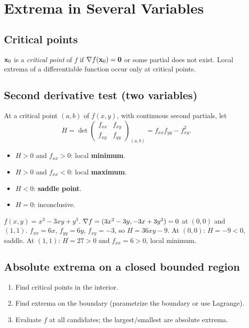 \section{Extrema in Several Variables}

\subsection{Critical points}
$\mathbf{x}_0$ is a \emph{critical point} of $f$ if $\nabla f(\mathbf{x}_0) = \mathbf{0}$ or some partial does
not exist. Local extrema of a differentiable function occur only at critical points.

\subsection{Second derivative test (two variables)}
At a critical point $(a,b)$ of $f(x,y)$, with continuous second partials, let
\[ H = \det \begin{pmatrix} f_{xx} & f_{xy} \\ f_{xy} & f_{yy} \end{pmatrix}_{(a,b)}
= f_{xx} f_{yy} - f_{xy}^2. \]
\begin{itemize}[leftmargin=*,nosep]
  \item $H > 0$ and $f_{xx} > 0$: local \textbf{minimum}.
  \item $H > 0$ and $f_{xx} < 0$: local \textbf{maximum}.
  \item $H < 0$: \textbf{saddle point}.
  \item $H = 0$: inconclusive.
\end{itemize}

\begin{example}
$f(x,y) = x^3 - 3xy + y^3$. $\nabla f = (3x^2 - 3y, -3x + 3y^2) = 0$ at $(0,0)$ and $(1,1)$.
$f_{xx} = 6x$, $f_{yy} = 6y$, $f_{xy} = -3$, so $H = 36xy - 9$.
At $(0,0)$: $H = -9 < 0$, saddle. At $(1,1)$: $H = 27 > 0$ and $f_{xx} = 6 > 0$, local minimum.
\end{example}

\subsection{Absolute extrema on a closed bounded region}
\begin{enumerate}[leftmargin=*,nosep]
  \item Find critical points in the interior.
  \item Find extrema on the boundary (parametrize the boundary or use Lagrange).
  \item Evaluate $f$ at all candidates; the largest/smallest are absolute extrema.
\end{enumerate}

